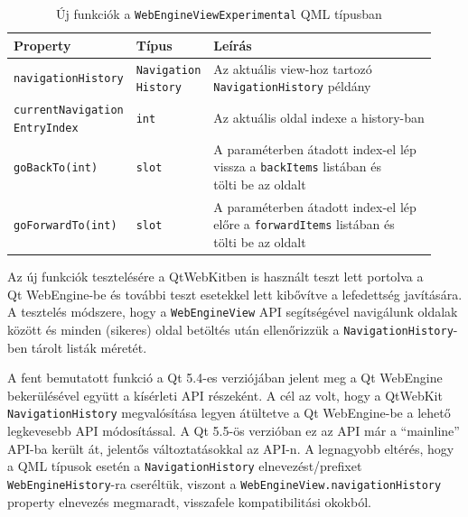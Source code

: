 \documentclass[12pt]{report}
\begin{document}
\begin{table}[ht]
    \centering
    \begin{tabular}{ | l | l | p{194pt} | }
        \hline
        \textbf{Property} & \textbf{Típus} & \textbf{Leírás} \\ \hline

        \texttt{navigationHistory} & \makecell[l]{\texttt{Navigation} \\ \texttt{History}} &
        \makecell[l]{Az aktuális view-hoz tartozó \\ \texttt{NavigationHistory} példány}
        \\ \hline

        \makecell[l]{\texttt{currentNavigation} \\ \texttt{EntryIndex}} & \texttt{int} &
        Az aktuális oldal indexe a history-ban
        \\ \hline

        \texttt{goBackTo(int)} & \texttt{slot} &
        \makecell[l]{A paraméterben átadott index-el lép \\
                     vissza a \texttt{backItems} listában és \\
                     tölti be az oldalt}
        \\ \hline

        \texttt{goForwardTo(int)} & \texttt{slot} &
        \makecell[l]{A paraméterben átadott index-el lép \\
                     előre a \texttt{forwardItems} listában és \\
                     tölti be az oldalt}
        \\ \hline
    \end{tabular}
    \caption{
        \label{tab:navigation-history-experimental-api}
        Új funkciók a \texttt{WebEngineViewExperimental} QML típusban
    }
\end{table}

Az új funkciók tesztelésére a QtWebKitben is használt teszt lett portolva a \\
Qt WebEngine-be és további teszt esetekkel lett kibővítve a lefedettség javítására.
A tesztelés módszere, hogy a \texttt{WebEngineView} API segítségével navigálunk oldalak
között és minden (sikeres) oldal betöltés után ellenőrizzük a \texttt{NavigationHistory}-ben
tárolt listák méretét.

A fent bemutatott funkció a Qt 5.4-es verziójában jelent meg a Qt WebEngine bekerülésével
együtt a kísérleti API részeként. A cél az volt, hogy a QtWebKit \\
\texttt{NavigationHistory} megvalósítása legyen átültetve a Qt WebEngine-be a lehető
legkevesebb API módosítással.
A Qt 5.5-ös verzióban ez az API már a ``mainline'' API-ba került át, jelentős
változtatásokkal az API-n. A legnagyobb eltérés, hogy a QML típusok esetén a
\texttt{NavigationHistory} elnevezést/prefixet \texttt{WebEngineHistory}-ra cseréltük,
viszont a \texttt{WebEngineView.navigationHistory} property elnevezés megmaradt, visszafele
kompatibilitási okokból.
\end{document}
